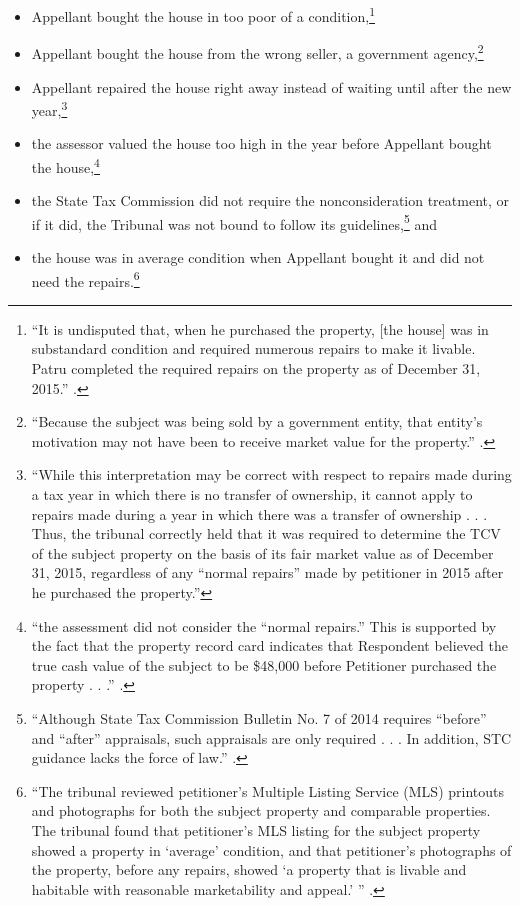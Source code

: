 \documentclass[12pt,\documentclassflag]{michiganCourtOfAppealsBrief}
\begin{document}
\begin{itemize}
\item Appellant bought the house in too poor of a condition,\footnote{``It is undisputed that, when he purchased the property, [the house] was in substandard condition and required numerous repairs to make it livable. Patru completed the required repairs on the property as of December 31, 2015.''
.
}
\item Appellant bought the house from the wrong seller, a government agency,\footnote{``Because the subject was being sold by a government entity, that entity's motivation may
not have been to receive market value for the property.'' .}
\item Appellant repaired the house right away instead of waiting until after the new year,\footnote{``While this interpretation may be correct with respect to repairs
made during a tax year in which there is no transfer of ownership, it cannot apply to repairs made
during a year in which there was a transfer of ownership . . . Thus, the tribunal correctly
held that it was required to determine the TCV of the subject property on the basis of its fair market
value as of December 31, 2015, regardless of any ``normal repairs'' made by petitioner in 2015
after he purchased the property.'' }
\item the assessor valued the house too high in the year before Appellant bought the house,\footnote{``the
assessment did not consider the ``normal repairs.'' This is supported by the fact that the
property record card indicates that Respondent believed the true cash value of the
subject to be \$48,000 before Petitioner purchased the property . . .'' .}
\item the State Tax Commission did not require the nonconsideration treatment, or if it did, the Tribunal was not bound to follow its guidelines,\footnote{``Although State Tax
Commission Bulletin No. 7 of 2014 requires ``before'' and ``after'' appraisals, such appraisals are only
required . . . In addition, STC guidance lacks the force of law.'' .} and 
\item the house was in average condition when Appellant bought it and did not need the repairs.\footnote{``The tribunal reviewed petitioner's Multiple Listing Service (MLS) printouts and
photographs for both the subject property and comparable properties. The tribunal found that
petitioner's MLS listing for the subject property showed a property in `average' condition, and
that petitioner's photographs of the property, before any repairs, showed `a property that is livable
and habitable with reasonable marketability and appeal.' '' .}
\end{itemize}
\end{document}
